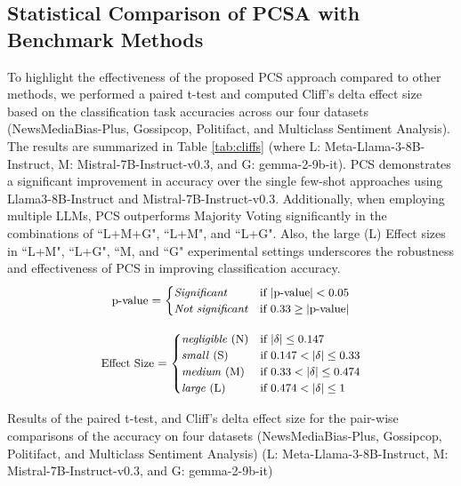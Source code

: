 \subsection{Statistical Comparison of PCSA with Benchmark Methods}
\label{sec:cliffs}
To highlight the effectiveness of the proposed PCS approach compared to other methods, we performed a paired t-test and computed Cliff's delta effect size based on the classification task accuracies across our four datasets (NewsMediaBias-Plus, Gossipcop, Politifact, and Multiclass Sentiment Analysis). The results are summarized in Table \ref{tab:cliffs} (where L: Meta-Llama-3-8B-Instruct, M: Mistral-7B-Instruct-v0.3, and G: gemma-2-9b-it). PCS demonstrates a significant improvement in accuracy over the single few-shot approaches using Llama3-8B-Instruct and Mistral-7B-Instruct-v0.3. Additionally, when employing multiple LLMs, PCS outperforms Majority Voting significantly in the combinations of ``L+M+G", ``L+M", and ``L+G". Also, the large (L) Effect sizes in ``L+M", ``L+G", ``M, and ``G" experimental settings underscores the robustness and effectiveness of PCS in improving classification accuracy.
\[
 \small
\text{p-value}= 
\begin{cases} 

\text{\textit{Significant}} & \text{if } |\text{p-value}| < 0.05 \\

\text{\textit{Not significant}} & \text{if } 0.33 \geq |\text{p-value}| \\


\end{cases}
\]

\[
 \small
\text{Effect Size}= 
\begin{cases} 
\text{\textit{negligible} (N)} & \text{if } |\delta| \leq 0.147 \\

\text{\textit{small} (S)} & \text{if } 0.147 < |\delta| \leq 0.33 \\

\text{\textit{medium} (M)} & \text{if } 0.33 < |\delta| \leq 0.474 \\

\text{\textit{large} (L)} & \text{if } 0.474 < |\delta| \leq 1 \\

\end{cases}
\]
\begin{table}[h]
\centering%
\caption{Results of the paired t-test,  and Cliff’s delta effect size for the pair-wise comparisons of the accuracy on four datasets (NewsMediaBias-Plus, Gossipcop, Politifact, and Multiclass Sentiment Analysis) (L: Meta-Llama-3-8B-Instruct, M: Mistral-7B-Instruct-v0.3, and G: gemma-2-9b-it)}
\label{tab:cliffs}
\vskip 0.15in
{

}
\end{table}

